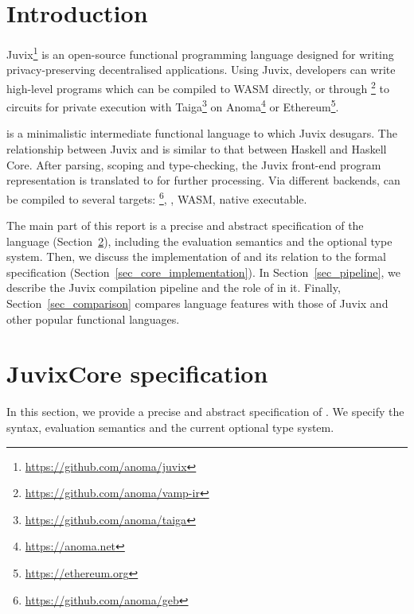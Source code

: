 \documentclass[
    9pt,            %
    techreport,        %
    affiltop,       %
]{art}
\begin{document}
\maketitle
\tableofcontents

\section{Introduction}

Juvix\footnote{\url{https://github.com/anoma/juvix}} is an open-source
functional programming language designed for writing privacy-preserving
decentralised applications. Using Juvix, developers can write high-level
programs which can be compiled to WASM directly, or through
\VampIR\footnote{\url{https://github.com/anoma/vamp-ir}} to circuits for
private execution with Taiga\footnote{\url{https://github.com/anoma/taiga}}
on Anoma\footnote{\url{https://anoma.net}} or
Ethereum\footnote{\url{https://ethereum.org}}.

\JuvixCore{} is a minimalistic intermediate functional language to which
Juvix desugars. The relationship between Juvix and \JuvixCore{} is similar
to that between Haskell and Haskell Core. After parsing, scoping and
type-checking, the Juvix front-end program representation is translated to
\JuvixCore{} for further processing. Via different backends, \JuvixCore{}
can be compiled to several targets:
\Geb{}\footnote{\url{https://github.com/anoma/geb}}, \VampIR, WASM, native
executable.

The main part of this report is a precise and abstract specification of the
\JuvixCore{} language (Section~\ref{sec_specification}), including the
evaluation semantics and the optional type system. Then, we discuss the
implementation of \JuvixCore{} and its relation to the formal specification
(Section~\ref{sec_core_implementation}). In Section~\ref{sec_pipeline}, we
describe the Juvix compilation pipeline and the role of \JuvixCore{} in it.
Finally, Section~\ref{sec_comparison} compares \JuvixCore{} language
features with those of Juvix and other popular functional languages.

\section{JuvixCore specification}\label{sec_specification}

In this section, we provide a precise and abstract specification of
\JuvixCore{}. We specify the syntax, evaluation semantics and the current
optional type system.
\end{document}
